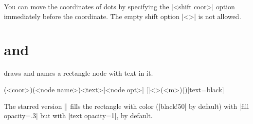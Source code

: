 You can move the coordinates of dots by specifying the |<shift coor>| option immediately before the  coordinate.
The empty shift option |<>| is not allowed.

\begin{tzcode}{.3}
\end{tzcode}




\section{\protect\cmd{\tznodeframe} and \protect\cmd{\tznodeframe*}}
\label{s:tznodeframe}

\icmd{\tznodeframe} draws and names a rectangle node with text in it.


\begin{tzdef}{}
\tznodeframe[<opt>](<coor>)(<node name>){<text>}[<node opt>]
 []<>(<m>)(){}[text=black]
\end{tzdef}


\begin{tzcode}{.3}
{}
\end{tzcode}

\begin{tzcode}{.3}
\end{tzcode}

The starred version |\tznodeframe*| fills the rectangle with color (|black!50| by default) with |fill opacity=.3| but with |text opacity=1|, by default.

